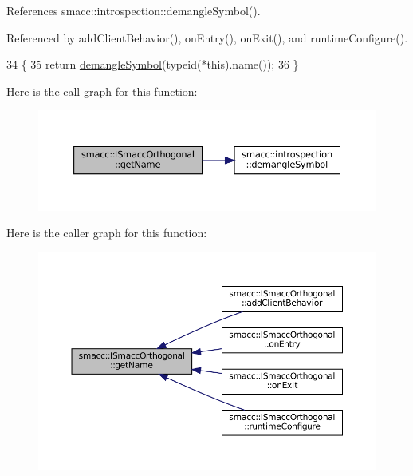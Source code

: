 References smacc\+::introspection\+::demangle\+Symbol().



Referenced by add\+Client\+Behavior(), on\+Entry(), on\+Exit(), and runtime\+Configure().


\begin{DoxyCode}
34   \{
35     \textcolor{keywordflow}{return} \hyperlink{namespacesmacc_1_1introspection_a2f495108db3e57604d8d3ff5ef030302}{demangleSymbol}(\textcolor{keyword}{typeid}(*this).name());
36   \}
\end{DoxyCode}
Here is the call graph for this function\+:
\nopagebreak
\begin{figure}[H]
\begin{center}
\leavevmode
\includegraphics[width=350pt]{classsmacc_1_1ISmaccOrthogonal_a45a444be97410cb061f8b9d5d77ee9b7_cgraph}
\end{center}
\end{figure}
Here is the caller graph for this function\+:
\nopagebreak
\begin{figure}[H]
\begin{center}
\leavevmode
\includegraphics[width=350pt]{classsmacc_1_1ISmaccOrthogonal_a45a444be97410cb061f8b9d5d77ee9b7_icgraph}
\end{center}
\end{figure}
\mbox{\label{classsmacc_1_1ISmaccOrthogonal_aae265ec480b8ed552ddc79afd2d93a62}} 
